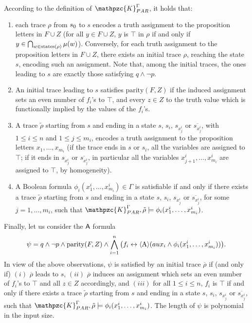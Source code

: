 %  
According to the definition of $\mathpzc{K}_{PAR}^{\Gamma}$, it holds that:
\begin{enumerate}
\item each trace $\rho$ from $s_0$ to $s$ encodes a truth assignment to the proposition letters in $F\cup Z$ (for all $y\in F\cup Z$, $y$ is $\top$ in $\rho$ if and only if $y\in\bigcap_{w\in\operatorname{states}(\rho)}\mu(w)$). Conversely, for each truth assignment to the proposition letters in $F\cup Z$, there exists an initial trace $\rho$, reaching the state $s$, encoding such an assignment. Note that, among the initial traces, the ones leading to $s$ are exactly those satisfying $q \wedge \neg p$.
%
\item An initial trace leading to $s$ satisfies $\text{parity}(F, Z)$ if the induced assignment sets an even number of $f_i$'s to $\top$, and every $z\in Z$ to the truth value which is functionally implied by the values of the $f_i$'s.
%
\item A trace $\tilde{\rho}$ starting from $s$ and ending in a state $s$, $s_i$, $s_{x_j^i}$ or $\overline{s_{x_j^i}}$, with $1 \leq i \leq n$ and $1 \leq j \leq m_i$, encodes a truth assignment to the proposition letters $x_1, \ldots, x_{m_i}$ (if the trace 
ends in $s$ or $s_i$, all the variables are assigned to $\top$; if it ends in $s_{x_j^i}$ or $\overline{s_{x_j^i}}$, in particular all the variables 
$x^i_{j+1}, \ldots , x^i_{m_i}$ are assigned to $\top$, by homogeneity).
%
\item A Boolean formula $\phi_i(x_1^i,\ldots , x_{m_i}^i) \in \Gamma$ is satisfiable if and only if there exists a trace $\tilde{\rho}$ starting from $s$ and ending in a state $s$, $s_i$, $s_{x_j^i}$ or $\overline{s_{x_j^i}}$, for some $j=1,\ldots , m_i$, such that $\mathpzc{K}_{PAR}^{\Gamma},\tilde{\rho}\models \phi_i(x_1^i,\ldots , x_{m_i}^i)$. 
\end{enumerate}

Finally, let us consider the $\mathsf{A}$ formula 
\[\psi=q \wedge \neg p \wedge \text{parity}(F, Z) \wedge \bigwedge_{i=1}^n \big(f_i \leftrightarrow \operatorname{\langle A\rangle}(aux_i \wedge \phi_i(x_1^i,\ldots , x_{m_i}^i))\big).\]
%
In view of the above observations, $\psi$ is satisfied by an initial trace $\overline{\rho}$ if (and only if) $(i)$ $\overline{\rho}$ leads to $s$, $(ii)$ $\overline{\rho}$ induces an assignment which sets an even number of $f_i$'s to $\top$ and all $z\in Z$ accordingly, and $(iii)$
for all $1 \leq i \leq n$, $f_i$ is $\top$ if and only if there exists a trace $\tilde{\rho}$ starting from $s$ and ending in a state $s$, $s_i$, $s_{x_j^i}$ or $\overline{s_{x_j^i}}$, such that $\mathpzc{K}_{PAR}^{\Gamma},\tilde{\rho}\models \phi_i(x_1^i,\ldots , x_{m_i}^i)$.
The length of $\psi$ is polynomial in the input size.


